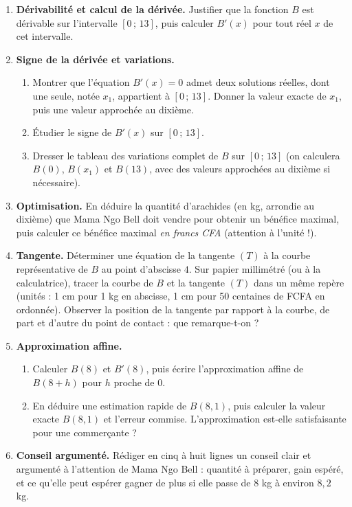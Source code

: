 \documentclass[11pt]{article}
\begin{document}
\begin{enumerate}
\item \textbf{Dérivabilité et calcul de la dérivée.} Justifier que la fonction $B$ est dérivable sur l'intervalle $[0\,;\,13]$, puis calculer $B'(x)$ pour tout réel $x$ de cet intervalle.
\item \textbf{Signe de la dérivée et variations.}
\begin{enumerate}
\item Montrer que l'équation $B'(x) = 0$ admet deux solutions réelles, dont une seule, notée $x_1$, appartient à $[0\,;\,13]$. Donner la valeur exacte de $x_1$, puis une valeur approchée au dixième.
\item Étudier le signe de $B'(x)$ sur $[0\,;\,13]$.
\item Dresser le tableau des variations complet de $B$ sur $[0\,;\,13]$ (on calculera $B(0)$, $B(x_1)$ et $B(13)$, avec des valeurs approchées au dixième si nécessaire).
\end{enumerate}
\item \textbf{Optimisation.} En déduire la quantité d'arachides (en kg, arrondie au dixième) que Mama Ngo Bell doit vendre pour obtenir un bénéfice maximal, puis calculer ce bénéfice maximal \emph{en francs CFA} (attention à l'unité !).
\item \textbf{Tangente.} Déterminer une équation de la tangente $(T)$ à la courbe représentative de $B$ au point d'abscisse $4$. Sur papier millimétré (ou à la calculatrice), tracer la courbe de $B$ et la tangente $(T)$ dans un même repère (unités : 1 cm pour 1 kg en abscisse, 1 cm pour 50 centaines de FCFA en ordonnée). Observer la position de la tangente par rapport à la courbe, de part et d'autre du point de contact : que remarque-t-on ?
\item \textbf{Approximation affine.}
\begin{enumerate}
\item Calculer $B(8)$ et $B'(8)$, puis écrire l'approximation affine de $B(8+h)$ pour $h$ proche de $0$.
\item En déduire une estimation rapide de $B(8{,}1)$, puis calculer la valeur exacte $B(8{,}1)$ et l'erreur commise. L'approximation est-elle satisfaisante pour une commerçante ?
\end{enumerate}
\item \textbf{Conseil argumenté.} Rédiger en cinq à huit lignes un conseil clair et argumenté à l'attention de Mama Ngo Bell : quantité à préparer, gain espéré, et ce qu'elle peut espérer gagner de plus si elle passe de $8$ kg à environ $8{,}2$ kg.
\end{enumerate}
\end{document}
